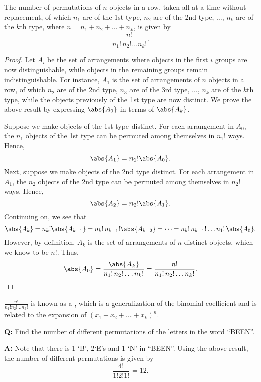 \begin{proposition}
    The number of permutations of $n$ objects in a row, taken all at a time without replacement, of which $n_1$ are of the 1st type, $n_2$ are of the 2nd type, $\dots$, $n_k$ are of the $k$th type, where $n = n_1 + n_2 + \dots + n_k$, is given by \[\frac{n!}{n_1! \, n_2! \dots n_k!}.\]
\end{proposition}
\begin{proof}
    Let $A_i$ be the set of arrangements where objects in the first $i$ groups are now distinguishable, while objects in the remaining groups remain indistinguishable. For instance, $A_1$ is the set of arrangements of $n$ objects in a row, of which $n_2$ are of the 2nd type, $n_3$ are of the 3rd type, $\dots$, $n_k$ are of the $k$th type, while the objects previously of the 1st type are now distinct. We prove the above result by expressing $\abs{A_0}$ in terms of $\abs{A_k}$.

    Suppose we make objects of the 1st type distinct. For each arrangement in $A_0$, the $n_1$ objects of the 1st type can be permuted among themselves in $n_1!$ ways. Hence, \[\abs{A_1} = n_1! \abs{A_0}.\] Next, suppose we make objects of the 2nd type distinct. For each arrangement in $A_1$, the $n_2$ objects of the 2nd type can be permuted among themselves in $n_2!$ ways. Hence, \[\abs{A_2} = n_2! \abs{A_1}.\] Continuing on, we see that \[\abs{A_k} = n_k! \abs{A_{k-1}} = n_k! \, n_{k-1}! \abs{A_{k-2}} = \cdots = n_k! \, n_{k-1}! \dots n_1! \, \abs{A_0}.\] However, by definition, $A_k$ is the set of arrangements of $n$ distinct objects, which we know to be $n!$. Thus, \[\abs{A_0} = \frac{\abs{A_k}}{n_1! \, n_2! \dots n_k!} = \frac{n!}{n_1! \, n_2! \dots n_k!}.\]
\end{proof}
\begin{remark}
    $\frac{n!}{n_1! n_2! \dots n_k!}$ is known as a , which is a generalization of the binomial coefficient and is related to the expansion of $(x_1 + x_2 + \dots + x_k)^n$.
\end{remark}

\begin{example}
    \phantom{.}

    \textbf{Q:} Find the number of different permutations of the letters in the word ``BEEN''.

    \textbf{A:} Note that there is 1 `B', 2`E's and 1 `N' in ``BEEN''. Using the above result, the number of different permutations is given by \[\frac{4!}{1! 2! 1!} = 12.\]
\end{example}

